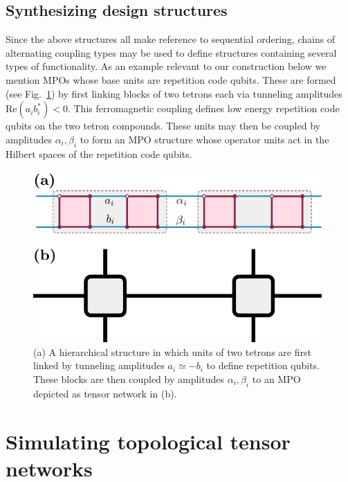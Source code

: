 \documentclass[twocolumn,floats,prx,showpacs]{revtex4-1}
\begin{document}
\subsection{Synthesizing design structures}
\label{sec:SynthDesign}

Since the above structures all make reference to sequential ordering, chains of alternating coupling types may be used to define structures containing several types of functionality. As an example relevant to our construction below we mention MPOs whose base units are repetition code qubits. These are formed  (see Fig.~\ref{fig:RepetitionMPS}) by first  linking blocks of two tetrons each via tunneling amplitudes $\mathrm{Re}(a_ib_i^\ast)<0$. This ferromagnetic coupling defines low energy repetition code qubits on the two tetron compounds. These units may then be coupled by amplitudes $\alpha_i,\beta_i$ to form an MPO structure whose operator units act in the Hilbert spaces of the repetition code qubits.  

\begin{figure}
\includegraphics[width=0.66\columnwidth]{fig/RepetitionMPS.pdf}
\caption{(a) A hierarchical structure in which units of two tetrons are first linked by tunneling amplitudes $a_i\simeq -b_i$ to define repetition qubits. These blocks are then coupled by amplitudes $\alpha_i, \beta_i$ to an MPO depicted as tensor network in (b).}
\label{fig:RepetitionMPS}
\end{figure}

\section{Simulating topological tensor networks}\label{sec4}
\end{document}
